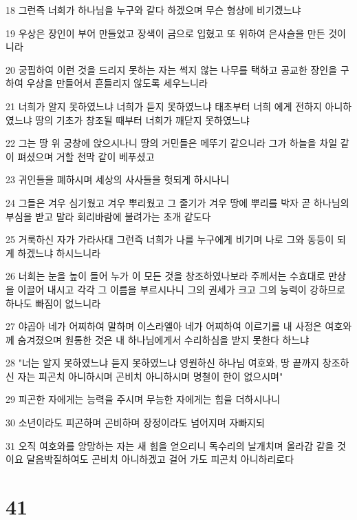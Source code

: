 \par 18 그런즉 너희가 하나님을 누구와 같다 하겠으며 무슨 형상에 비기겠느냐
\par 19 우상은 장인이 부어 만들었고 장색이 금으로 입혔고 또 위하여 은사슬을 만든 것이니라
\par 20 궁핍하여 이런 것을 드리지 못하는 자는 썩지 않는 나무를 택하고 공교한 장인을 구하여 우상을 만들어서 흔들리지 않도록 세우느니라
\par 21 너희가 알지 못하였느냐 너희가 듣지 못하였느냐 태초부터 너희 에게 전하지 아니하였느냐 땅의 기초가 창조될 때부터 너희가 깨닫지 못하였느냐
\par 22 그는 땅 위 궁창에 앉으시나니 땅의 거민들은 메뚜기 같으니라 그가 하늘을 차일 같이 펴셨으며 거할 천막 같이 베푸셨고
\par 23 귀인들을 폐하시며 세상의 사사들을 헛되게 하시나니
\par 24 그들은 겨우 심기웠고 겨우 뿌리웠고 그 줄기가 겨우 땅에 뿌리를 박자 곧 하나님의 부심을 받고 말라 회리바람에 불려가는 초개 같도다
\par 25 거룩하신 자가 가라사대 그런즉 너희가 나를 누구에게 비기며 나로 그와 동등이 되게 하겠느냐 하시느니라
\par 26 너희는 눈을 높이 들어 누가 이 모든 것을 창조하였나보라 주께서는 수효대로 만상을 이끌어 내시고 각각 그 이름을 부르시나니 그의 권세가 크고 그의 능력이 강하므로 하나도 빠짐이 없느니라
\par 27 야곱아 네가 어찌하여 말하며 이스라엘아 네가 어찌하여 이르기를 내 사정은 여호와께 숨겨졌으며 원통한 것은 내 하나님에게서 수리하심을 받지 못한다 하느냐
\par 28 "너는 알지 못하였느냐 듣지 못하였느냐 영원하신 하나님 여호와, 땅 끝까지 창조하신 자는 피곤치 아니하시며 곤비치 아니하시며 명철이 한이 없으시며"
\par 29 피곤한 자에게는 능력을 주시며 무능한 자에게는 힘을 더하시나니
\par 30 소년이라도 피곤하며 곤비하며 장정이라도 넘어지며 자빠지되
\par 31 오직 여호와를 앙망하는 자는 새 힘을 얻으리니 독수리의 날개치며 올라감 같을 것이요 달음박질하여도 곤비치 아니하겠고 걸어 가도 피곤치 아니하리로다

\chapter{41}

